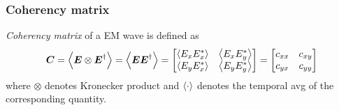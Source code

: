\documentclass[11pt,a4paper]{article}
\numberwithin{equation}{section}
\begin{document}
\subsubsection{Coherency matrix}
\textit{Coherency matrix} of a EM wave is defined as \cite{WO} 
\begin{align}
	\boldsymbol{C}=\expval{\boldsymbol{E}\otimes\boldsymbol{E}^\dagger}= \expval{\boldsymbol{E}\boldsymbol{E}^\dagger}=
	\begin{bmatrix}
		\expval{E_xE_x^\ast} & \expval{E_xE_y^\ast}\\
		\expval{E_yE_x^\ast} & \expval{E_yE_y^\ast}
	\end{bmatrix}=
\begin{bmatrix}
	c_{xx} & c_{xy}\\
	c_{yx} & c_{yy}
\end{bmatrix}\label{coherency matrix}
\end{align}
where $\otimes$ denotes Kronecker product and $\expval{\cdot}$ denotes the temporal avg of the corresponding quantity.
\end{document}
